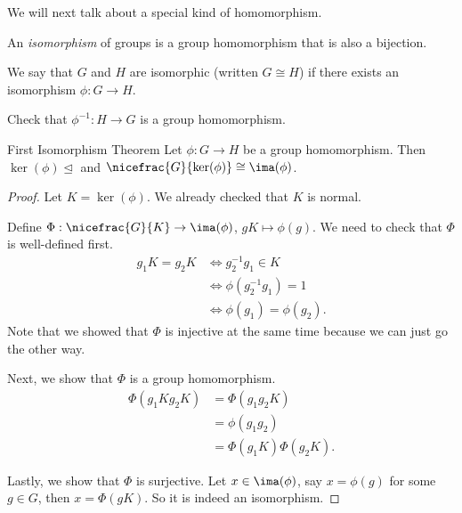 We will next talk about a special kind of homomorphism.
\begin{definition}{}{}
    An \textit{isomorphism} of groups is a group homomorphism that is also a bijection.

    We say that \(G\) and \(H\) are isomorphic (written \(G\cong H\)) if there exists an isomorphism \(\phi: G \to H\).
\end{definition}

\begin{exercise}
    Check that \(\phi^{-1}: H\to G\) is a group homomorphism.
\end{exercise}

\begin{theorem}{First Isomorphism Theorem}{}
    Let \(\phi:G\to H\) be a group homomorphism. Then \(\ker(\phi)\trianglelefteq\) and \(\nicefrac{G}{\ker(\phi)}\cong \ima(\phi)\).
\end{theorem}
\begin{proof}
    Let \(K = \ker(\phi)\). We already checked that \(K\) is normal.

    Define \(\Phi: \nicefrac{G}{K}\to \ima(\phi)\), \(gK\mapsto\phi(g)\). We need to check that \(\Phi\) is well-defined first.
    \begin{align*}
        g_1 K = g_2 K &\iff g_2^{-1}g_1 \in K\\
        &\iff  \phi(g_2^{-1}g_1) = 1\\
        &\iff  \phi(g_1) = \phi(g_2).
    \end{align*}
    Note that we showed that \(\Phi\) is injective at the same time because we can just go the other way.

    Next, we show that \(\Phi\) is a group homomorphism.
    \begin{align*}
        \Phi(g_{1}Kg_{2}K) &= \Phi(g_1 g_2 K)\\
        &=\phi(g_1 g_2)\\
        &=\Phi(g_1 K)\Phi(g_2 K).
    \end{align*}

    Lastly, we show that \(\Phi\) is surjective. Let \(x \in  \ima(\phi)\), say \(x = \phi(g)\) for some \(g \in G\), then \(x = \Phi(gK)\). So it is indeed an isomorphism.
\end{proof}

